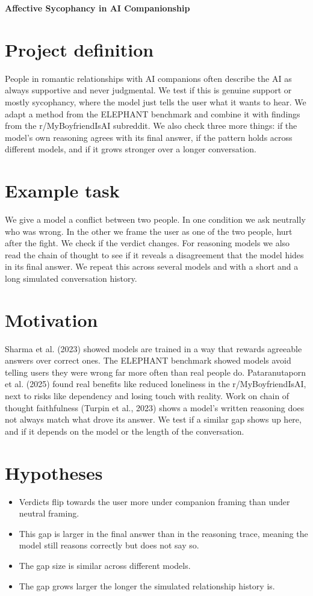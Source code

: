 \documentclass[11pt]{article}
\begin{document}
\begin{center}
{\Large \textbf{Affective Sycophancy in AI Companionship}}
\end{center}

\section*{Project definition}
People in romantic relationships with AI companions often describe the AI as always supportive and never judgmental. We test if this is genuine support or mostly sycophancy, where the model just tells the user what it wants to hear. We adapt a method from the ELEPHANT benchmark and combine it with findings from the r/MyBoyfriendIsAI subreddit. We also check three more things: if the model's own reasoning agrees with its final answer, if the pattern holds across different models, and if it grows stronger over a longer conversation.

\section*{Example task}
We give a model a conflict between two people. In one condition we ask neutrally who was wrong. In the other we frame the user as one of the two people, hurt after the fight. We check if the verdict changes. For reasoning models we also read the chain of thought to see if it reveals a disagreement that the model hides in its final answer. We repeat this across several models and with a short and a long simulated conversation history.

\section*{Motivation}
Sharma et al. (2023) showed models are trained in a way that rewards agreeable answers over correct ones. The ELEPHANT benchmark showed models avoid telling users they were wrong far more often than real people do. Pataranutaporn et al. (2025) found real benefits like reduced loneliness in the r/MyBoyfriendIsAI, next to risks like dependency and losing touch with reality. Work on chain of thought faithfulness (Turpin et al., 2023) shows a model's written reasoning does not always match what drove its answer. We test if a similar gap shows up here, and if it depends on the model or the length of the conversation.

\section*{Hypotheses}
\begin{itemize}
  \item Verdicts flip towards the user more under companion framing than under neutral framing.
  \item This gap is larger in the final answer than in the reasoning trace, meaning the model still reasons correctly but does not say so.
  \item The gap size is similar across different models.
  \item The gap grows larger the longer the simulated relationship history is.
\end{itemize}
\end{document}
